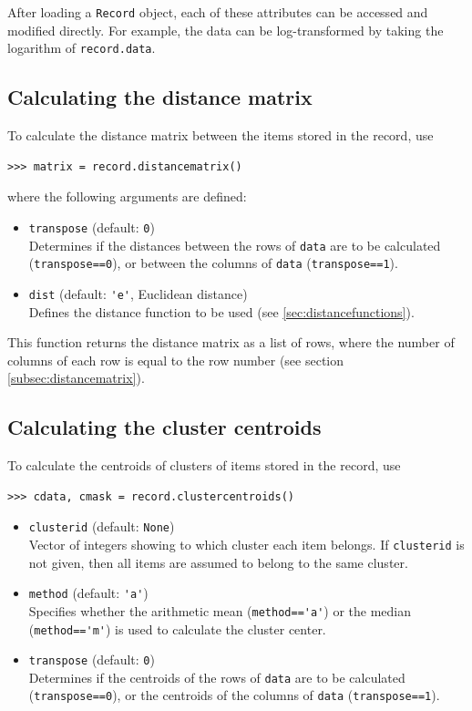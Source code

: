 \documentclass{report}
\begin{document}
After loading a \verb|Record| object, each of these attributes can be accessed and modified directly. For example, the data can be log-transformed by taking the logarithm of \verb|record.data|.

\subsection*{Calculating the distance matrix}

To calculate the distance matrix between the items stored in the record, use
\begin{verbatim}
>>> matrix = record.distancematrix()
\end{verbatim}
where the following arguments are defined:
\begin{itemize}
\item \verb|transpose| (default: \verb|0|) \\
Determines if the distances between the rows of \verb|data| are to be calculated (\verb|transpose==0|), or between the columns of \verb|data| (\verb|transpose==1|).
\item \verb|dist| (default: \verb|'e'|, Euclidean distance) \\
Defines the distance function to be used (see \ref{sec:distancefunctions}).
\end{itemize}

This function returns the distance matrix as a list of rows, where the number of columns of each row is equal to the row number (see section \ref{subsec:distancematrix}).

\subsection*{Calculating the cluster centroids}

To calculate the centroids of clusters of items stored in the record, use
\begin{verbatim}
>>> cdata, cmask = record.clustercentroids()
\end{verbatim}

\begin{itemize}
\item \verb|clusterid| (default: \verb|None|) \\
Vector of integers showing to which cluster each item belongs. If \verb|clusterid| is not given, then all items are assumed to belong to the same cluster.
\item \verb|method| (default: \verb|'a'|) \\
Specifies whether the arithmetic mean (\verb|method=='a'|) or the median (\verb|method=='m'|) is used to calculate the cluster center.
\item \verb|transpose| (default: \verb|0|) \\
Determines if the centroids of the rows of \verb|data| are to be calculated (\verb|transpose==0|), or the centroids of the columns of \verb|data| (\verb|transpose==1|).
\end{itemize}
\end{document}
